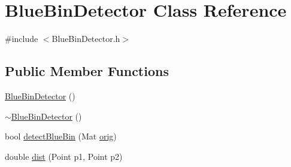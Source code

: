 \hypertarget{classBlueBinDetector}{}\section{Blue\+Bin\+Detector Class Reference}
\label{classBlueBinDetector}


{\ttfamily \#include $<$Blue\+Bin\+Detector.\+h$>$}

\subsection*{Public Member Functions}
\begin{DoxyCompactItemize}
\item 
\hyperlink{classBlueBinDetector_ad082c0687a01c1868cb6e3478ba3f774}{Blue\+Bin\+Detector} ()
\item 
\hyperlink{classBlueBinDetector_a482faf6ce9a83043b1ed0c53f708712e}{$\sim$\+Blue\+Bin\+Detector} ()
\item 
bool \hyperlink{classBlueBinDetector_ab428c2aa1474c1bb0c1aceac4bc4b028}{detect\+Blue\+Bin} (Mat \hyperlink{qualification__task_8cpp_ae544386e0f095e03d639cf884b7a8a1b}{orig})
\item 
double \hyperlink{classBlueBinDetector_a5e63ca51780f42539fc2ff6c8cc45c3f}{dist} (Point p1, Point p2)
\end{DoxyCompactItemize}
